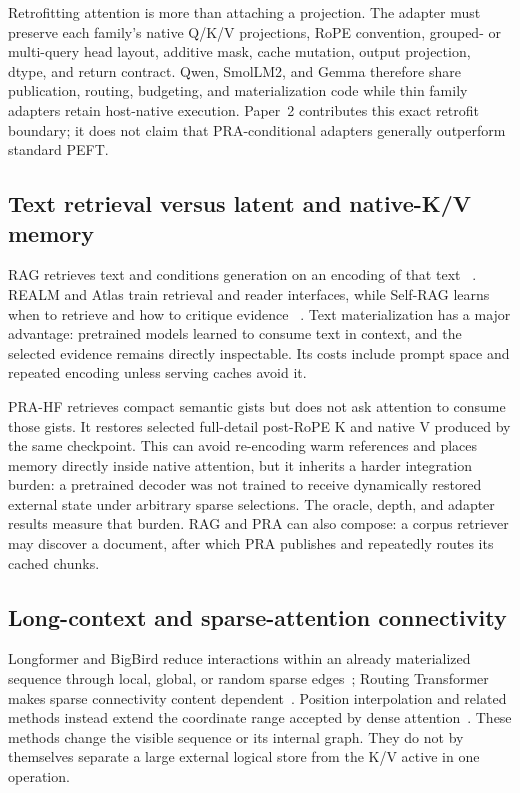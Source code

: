 \documentclass[11pt]{article}
\begin{document}
Retrofitting attention is more than attaching a projection. The adapter must preserve each
family's native Q/K/V projections, RoPE convention, grouped- or multi-query head layout,
additive mask, cache mutation, output projection, dtype, and return contract. Qwen, SmolLM2,
and Gemma therefore share publication, routing, budgeting, and materialization code while thin
family adapters retain host-native execution. Paper~2 contributes this exact retrofit boundary;
it does not claim that PRA-conditional adapters generally outperform standard PEFT.

\subsection{Text retrieval versus latent and native-K/V memory}

RAG retrieves text and conditions generation on an encoding of that text
~\cite{lewis2020rag}. REALM and Atlas train retrieval and reader interfaces, while Self-RAG
learns when to retrieve and how to critique evidence
~\cite{guu2020realm,izacard2023atlas,asai2024selfrag}. Text materialization has a major advantage:
pretrained models learned to consume text in context, and the selected evidence remains directly
inspectable. Its costs include prompt space and repeated encoding unless serving caches avoid it.

PRA-HF retrieves compact semantic gists but does not ask attention to consume those gists. It
restores selected full-detail post-RoPE K and native V produced by the same checkpoint. This can
avoid re-encoding warm references and places memory directly inside native attention, but it
inherits a harder integration burden: a pretrained decoder was not trained to receive
dynamically restored external state under arbitrary sparse selections. The oracle, depth, and
adapter results measure that burden. RAG and PRA can also compose: a corpus retriever may discover
a document, after which PRA publishes and repeatedly routes its cached chunks.

\subsection{Long-context and sparse-attention connectivity}

Longformer and BigBird reduce interactions within an already materialized sequence through
local, global, or random sparse edges~\cite{beltagy2020longformer,zaheer2020bigbird}; Routing
Transformer makes sparse connectivity content dependent~\cite{roy2021routing}. Position
interpolation and related methods instead extend the coordinate range accepted by dense
attention~\cite{chen2023positioninterpolation,ding2024longrope}. These methods change the
visible sequence or its internal graph. They do not by themselves separate a large external
logical store from the K/V active in one operation.
\end{document}
